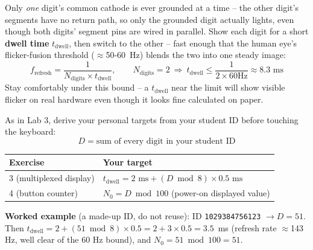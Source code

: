 \documentclass[11pt]{article}
\begin{document}
\begin{summary}
Only \emph{one} digit's common cathode is ever grounded at a time -- the other
digit's segments have no return path, so only the grounded digit actually lights,
even though both digits' segment pins are wired in parallel. Show each digit for a
short \textbf{dwell time} $t_{\text{dwell}}$, then switch to the other -- fast
enough that the human eye's flicker-fusion threshold ($\approx$50-60~Hz) blends the
two into one steady image:
\[
f_{\text{refresh}} = \frac{1}{N_{\text{digits}} \times t_{\text{dwell}}}, \qquad
N_{\text{digits}} = 2 \ \Rightarrow\ t_{\text{dwell}} \le \frac{1}{2 \times 60\text{Hz}}
\approx 8.3\text{ ms}
\]
Stay comfortably under this bound -- a $t_{\text{dwell}}$ near the limit will show
visible flicker on real hardware even though it looks fine calculated on paper.
\end{summary}

\begin{summary}
As in Lab 3, derive your personal targets from your student ID before touching the
keyboard:
\[
D = \text{sum of every digit in your student ID}
\]
\begin{center}
\begin{tabular}{@{}p{5.7cm}p{8.9cm}@{}}
\toprule
\textbf{Exercise} & \textbf{Your target} \\
\midrule
3 (multiplexed display) & $t_{\text{dwell}} = 2\text{ ms} + (D \bmod 8) \times 0.5\text{ ms}$ \\
4 (button counter) & $N_0 = D \bmod 100$ (power-on displayed value) \\
\bottomrule
\end{tabular}
\end{center}
\textbf{Worked example} (a made-up ID, do not reuse): ID \texttt{1029384756123}
$\to D = 51$. Then $t_{\text{dwell}} = 2 + (51 \bmod 8) \times 0.5 = 2 + 3\times0.5 =
3.5$~ms (refresh rate $\approx$143 Hz, well clear of the 60 Hz bound), and
$N_0 = 51 \bmod 100 = 51$.
\end{summary}
\end{document}

